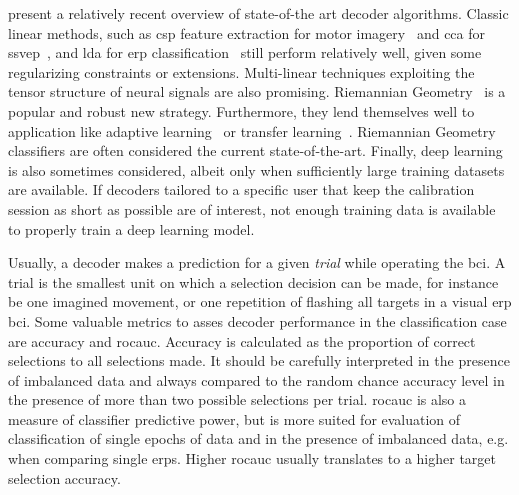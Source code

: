 \textcite{Lotte2018, Xu2021} present a relatively recent overview of state-of-the art
decoder algorithms.
Classic linear methods, such as \ac{csp} feature extraction for
motor imagery~\cite{Park2017} and \ac{cca} for \ac{ssvep}~\cite{Nakanishi2017},
and \ac{lda} for \ac{erp} classification~\cite{Sosulski2022} still perform
relatively well, given some regularizing constraints or extensions.
Multi-linear techniques exploiting the tensor structure of neural signals are
also promising.
Riemannian Geometry~\cite{Barachant2014} is a popular and robust new strategy.
Furthermore, they lend themselves well to application like adaptive
learning~\cite{Benaroch2021} or transfer learning~\cite{Zanini2017}.
Riemannian Geometry classifiers are often considered the current
state-of-the-art.
Finally, deep learning~\cite{Bhuvaneshwari2021} is also sometimes considered,
albeit only when sufficiently large training datasets are available.
If decoders tailored to a specific user that keep the calibration session as
short as possible are of interest, not enough training data is available to
properly train a deep learning model.

Usually, a decoder makes a prediction for a given \emph{trial} while operating
the \ac{bci}.
A trial is the smallest unit on which a selection decision can be made, for
instance be one imagined movement, or one repetition of flashing all targets
in a visual \ac{erp} \ac{bci}.
Some valuable metrics to asses decoder performance in the classification case
are accuracy and \ac{rocauc}.
Accuracy is calculated as the proportion of correct selections to all
selections made.
It should be carefully interpreted in the presence of imbalanced data and always compared to the
random chance accuracy level in the presence of more than two possible
selections per trial.
\Ac{rocauc} is also a measure of classifier predictive power, but is more
suited for evaluation of classification of single epochs of data and in the
presence of imbalanced data, e.g. when comparing single \acp{erp}.
Higher \ac{rocauc} usually translates to a higher target selection accuracy.

